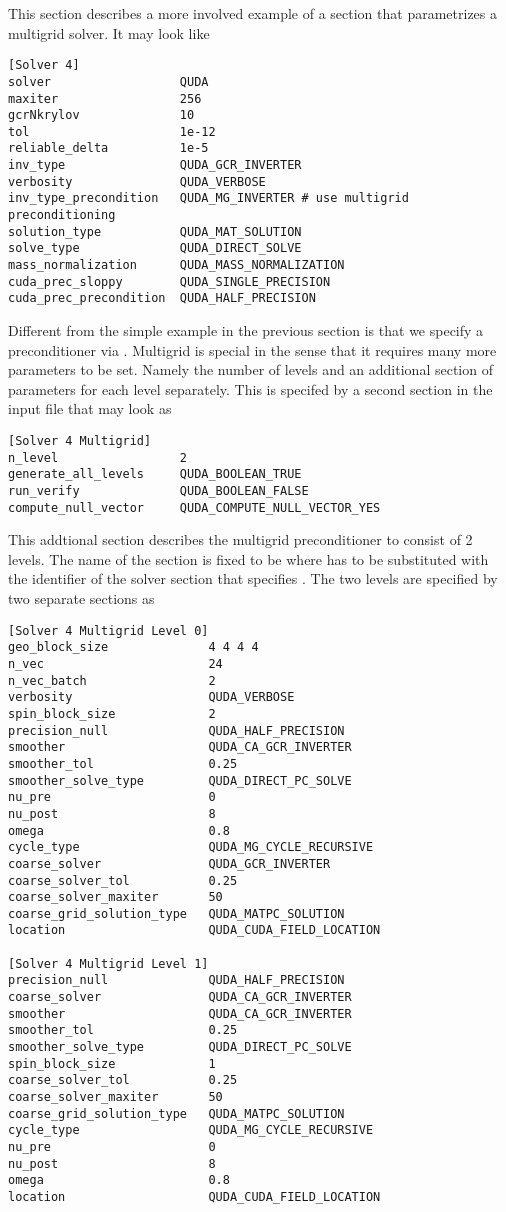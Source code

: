 This section describes a more involved example of a section that parametrizes a multigrid solver.
It may look like
\begin{verbatim}
[Solver 4]
solver                  QUDA
maxiter                 256
gcrNkrylov              10
tol                     1e-12
reliable_delta          1e-5
inv_type                QUDA_GCR_INVERTER
verbosity               QUDA_VERBOSE
inv_type_precondition   QUDA_MG_INVERTER # use multigrid preconditioning
solution_type           QUDA_MAT_SOLUTION
solve_type              QUDA_DIRECT_SOLVE
mass_normalization      QUDA_MASS_NORMALIZATION
cuda_prec_sloppy        QUDA_SINGLE_PRECISION
cuda_prec_precondition  QUDA_HALF_PRECISION
\end{verbatim}
Different from the simple example in the previous section is that we specify a preconditioner via .
Multigrid is special in the sense that it requires many more parameters to be set.
Namely the number of levels and an additional section of parameters for each level separately.
This is specifed by a second section in the input file that may look as
\begin{verbatim}
[Solver 4 Multigrid]
n_level                 2
generate_all_levels     QUDA_BOOLEAN_TRUE
run_verify              QUDA_BOOLEAN_FALSE
compute_null_vector     QUDA_COMPUTE_NULL_VECTOR_YES
\end{verbatim}
This addtional section describes the multigrid preconditioner to consist of 2 levels.
The name of the section is fixed to be  where  has to be substituted with the identifier of the solver section that specifies .
The two levels are specified by two separate sections as
\begin{verbatim}
[Solver 4 Multigrid Level 0]
geo_block_size              4 4 4 4
n_vec                       24
n_vec_batch                 2
verbosity                   QUDA_VERBOSE
spin_block_size             2
precision_null              QUDA_HALF_PRECISION
smoother                    QUDA_CA_GCR_INVERTER
smoother_tol                0.25
smoother_solve_type         QUDA_DIRECT_PC_SOLVE
nu_pre                      0
nu_post                     8
omega                       0.8
cycle_type                  QUDA_MG_CYCLE_RECURSIVE
coarse_solver               QUDA_GCR_INVERTER
coarse_solver_tol           0.25
coarse_solver_maxiter       50
coarse_grid_solution_type   QUDA_MATPC_SOLUTION
location                    QUDA_CUDA_FIELD_LOCATION

[Solver 4 Multigrid Level 1]
precision_null              QUDA_HALF_PRECISION
coarse_solver               QUDA_CA_GCR_INVERTER
smoother                    QUDA_CA_GCR_INVERTER
smoother_tol                0.25
smoother_solve_type         QUDA_DIRECT_PC_SOLVE
spin_block_size             1
coarse_solver_tol           0.25
coarse_solver_maxiter       50
coarse_grid_solution_type   QUDA_MATPC_SOLUTION
cycle_type                  QUDA_MG_CYCLE_RECURSIVE
nu_pre                      0
nu_post                     8
omega                       0.8
location                    QUDA_CUDA_FIELD_LOCATION
\end{verbatim}
